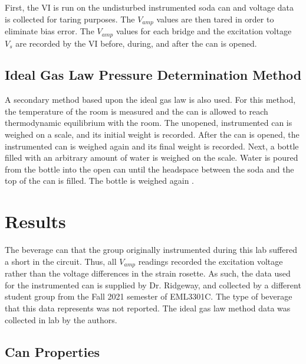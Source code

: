 \documentclass[10pt,journal,letterpaper]{IEEEtran}
\begin{document}
First, the VI is run on the undisturbed instrumented soda can and voltage data is collected for taring purposes.
The $V_{amp}$ values are then tared in order to eliminate bias error.
The $V_{amp}$ values for each bridge and the excitation voltage $V_s$ are recorded by the VI before, during, and after the can is opened. 

\subsection{Ideal Gas Law Pressure Determination Method}

A secondary method based upon the ideal gas law is also used.
For this method, the temperature of the room is measured and the can is allowed to reach thermodynamic equilibrium with the room.
The unopened, instrumented can is weighed on a scale, and its initial weight is recorded.
After the can is opened, the instrumented can is weighed again and its final weight is recorded.
Next, a bottle filled with an arbitrary amount of water is weighed on the scale.
Water is poured from the bottle into the open can until the headspace between the soda and the top of the can is filled.
The bottle is weighed again \cite{b9}.

\section{Results}

The beverage can that the group originally instrumented during this lab suffered a short in the circuit.
Thus, all $V_{amp}$ readings recorded the excitation voltage rather than the voltage differences in the strain rosette.
As such, the data used for the instrumented can is supplied by Dr. Ridgeway, and collected by a different student group from the Fall 2021 semester of EML3301C.
The type of beverage that this data represents was not reported.
The ideal gas law method data was collected in lab by the authors.

\subsection{Can Properties}
\end{document}
